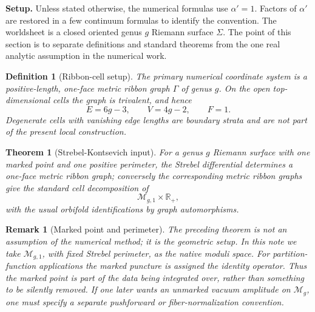 \documentclass[11pt]{article}
\numberwithin{equation}{section}
\newcommand{\A}{\alpha'}
\newcommand{\bR}{\mathbb R}
\newcommand{\cM}{\mathcal M}
\newtheorem{definition}{Definition}
\newtheorem{theorem}{Theorem}
\newtheorem{remark}{Remark}
\begin{document}
\noindent\textbf{Setup.}
Unless stated otherwise, the numerical formulas use \(\A=1\).  Factors of
\(\A\) are restored in a few continuum formulas to identify the convention.
The worldsheet is a closed oriented genus \(g\) Riemann surface \(\Sigma\).
The point of this section is to separate definitions and standard theorems from
the one real analytic assumption in the numerical work.

\begin{definition}[Ribbon-cell setup]
The primary numerical coordinate system is a positive-length, one-face metric
ribbon graph \(\Gamma\) of genus \(g\).  On the open top-dimensional cells the
graph is trivalent, and hence
\begin{equation}
        E=6g-3,\qquad V=4g-2,\qquad F=1.
\end{equation}
Degenerate cells with vanishing edge lengths are boundary strata and are not
part of the present local construction.
\end{definition}

\begin{theorem}[Strebel-Kontsevich input]
For a genus \(g\) Riemann surface with one marked point and one positive
perimeter, the Strebel differential determines a one-face metric ribbon graph;
conversely the corresponding metric ribbon graphs give the standard cell
decomposition of
\begin{equation}
        \cM_{g,1}\times \bR_{+},
\end{equation}
with the usual orbifold identifications by graph automorphisms.
\end{theorem}

\begin{remark}[Marked point and perimeter]
The preceding theorem is not an assumption of the numerical method; it is the
geometric setup.  In this note we take \(\cM_{g,1}\), with fixed Strebel
perimeter, as the native moduli space.  For partition-function applications the
marked puncture is assigned the identity operator.  Thus the marked point is
part of the data being integrated over, rather than something to be silently
removed.  If one later wants an unmarked vacuum amplitude on \(\cM_g\), one
must specify a separate pushforward or fiber-normalization convention.
\end{remark}
\end{document}

